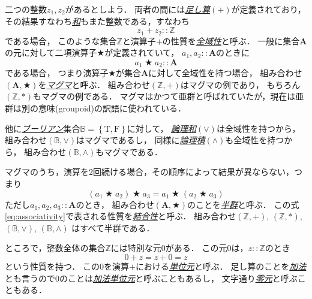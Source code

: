 \documentclass[a5paper,draft]{jsbook}
\newcommand{\keyword}[1]{{\underline{\emph{#1}}}}
\newcommand{\mathConstant}[1]{\mathrm{#1}} %
\newcommand{\mathSet}[1]{\mathbf{#1}} %
\newcommand{\mathSpecialSet}[1]{\mathbb{#1}} %
\newcommand{\mathSetWith}[1]{\left\{#1\right\}}
\newcommand{\mathTupleWith}[1]{\left(#1\right)}
\newcommand{\mathTrue}{\mathConstant{T}}
\newcommand{\mathFalse}{\mathConstant{F}}
\newcommand{\mathAnyBinaryOperator}{\mathbin{\bigstar}}
\newcommand{\mathIn}{\mathrel{::}}
\begin{document}
二つの整数$z_1,z_2$があるとしよう．
両者の間には\keyword{足し算}$(+)$が定義されており，
その結果すなわち\keyword{和}もまた整数である，すなわち
\begin{equation}
z_1+z_2\mathIn\mathSpecialSet{Z}
\end{equation}
である場合，
このような集合$\mathSpecialSet{Z}$と演算子$+$の性質を\keyword{全域性}と呼ぶ．
一般に集合$\mathSet{A}$の元に対して二項演算子$\mathAnyBinaryOperator$が定義されていて，
$a_1,a_2\mathIn\mathSet{A}$のときに
\begin{equation}
\label{eq:totality}
a_1\mathAnyBinaryOperator a_2\mathIn\mathSet{A}
\end{equation}
である場合，
つまり演算子$\mathAnyBinaryOperator$が集合$\mathSet{A}$に対して全域性を持つ場合，
組み合わせ$\mathTupleWith{\mathSet{A},\mathAnyBinaryOperator}$を\keyword{マグマ}と呼ぶ．
組み合わせ$\mathTupleWith{\mathSpecialSet{Z},+}$はマグマの例であり，
もちろん$\mathTupleWith{\mathSpecialSet{Z},*}$もマグマの例である．
マグマはかつて亜群と呼ばれていたが，現在は亜群は別の意味(groupoid)の訳語に使われている．

他に\keyword{ブーリアン}集合$\mathSpecialSet{B}=\mathSetWith{\mathTrue,\mathFalse}$に対して，
\keyword{論理和}$(\vee)$は全域性を持つから，
組み合わせ$\mathTupleWith{\mathSpecialSet{B},\vee}$はマグマであるし，
同様に\keyword{論理積}$(\wedge)$も全域性を持つから，
組み合わせ$\mathTupleWith{\mathSpecialSet{B},\wedge}$もマグマである．

マグマのうち，演算を2回続ける場合，その順序によって結果が異ならない，つまり
\begin{equation}
\label{eq:associativity}
\left(a_1\mathAnyBinaryOperator a_2\right)\mathAnyBinaryOperator a_3
=a_1\mathAnyBinaryOperator\left(a_2\mathAnyBinaryOperator a_3\right)
\end{equation}
ただし$a_1,a_2,a_3\mathIn\mathSet{A}$のとき，
組み合わせ$\mathTupleWith{\mathSet{A},\mathAnyBinaryOperator}$のことを\keyword{半群}と呼ぶ．
この式\eqref{eq:associativity}で表される性質を\keyword{結合性}と呼ぶ．
組み合わせ$\mathTupleWith{\mathSpecialSet{Z},+}$,
$\mathTupleWith{\mathSpecialSet{Z},*}$,
$\mathTupleWith{\mathSpecialSet{B},\vee}$,
$\mathTupleWith{\mathSpecialSet{B},\wedge}$ はすべて半群である．

ところで，整数全体の集合$\mathSpecialSet{Z}$には特別な元$0$がある．
この元$0$は，$z\mathIn\mathSpecialSet{Z}$のとき
\begin{equation}
0+z=z+0=z
\end{equation}
という性質を持つ．
この$0$を演算$+$における\keyword{単位元}と呼ぶ．
足し算のことを\keyword{加法}とも言うので$0$のことは\keyword{加法単位元}と呼ぶこともあるし，
文字通り\keyword{零元}と呼ぶこともある．
\end{document}
